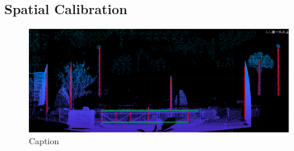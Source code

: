 \documentclass{erauthesis}
\begin{document}
\subsection{Spatial Calibration}



\begin{figure}[htbp]
    \centering
    \includegraphics[width=0.8\linewidth]{Images/LiDAR_features.png}
    \caption{Caption}
    \label{fig:LiDAR_features}
\end{figure}







\end{document}

